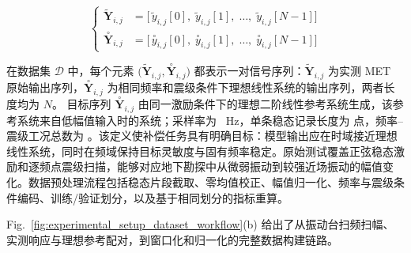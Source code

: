 \documentclass[sn-nature]{sn-jnl}
\newcommand{\fidx}{i} %
\newcommand{\midx}{j} %
\newcommand{\pmax}{N} %
\newcommand{\dataset}{{\mathcal{D}}} %
\newcommand{\yseq}{{\mathbf{Y}}} %
\newcommand{\ideal}[1]{\overset{\circ}{#1}} %
\newcommand{\exam}[1]{\tilde{#1}} %
\begin{document}
\begin{equation}
    \left\{
    \begin{aligned}
        \exam{\yseq}_{\fidx,\midx}  & =
        \bigl[
            \,\exam{y}_{\fidx,\midx}[0],\;
            \exam{y}_{\fidx,\midx}[1],\;
            \ldots,\;
            \exam{y}_{\fidx,\midx}[\pmax-1]
        \bigr]                          \\
        \ideal{\yseq}_{\fidx,\midx} & =
        \bigl[
            \,\ideal{y}_{\fidx,\midx}[0],\;
            \ideal{y}_{\fidx,\midx}[1],\;
            \ldots,\;
            \ideal{y}_{\fidx,\midx}[\pmax-1]
            \bigr]
    \end{aligned}
    \right.
    \label{eq:dataset_element}
\end{equation}

在数据集 $\dataset$ 中，每个元素 $\bigl(\exam{\yseq}_{\fidx,\midx}, \ideal{\yseq}_{\fidx,\midx}\bigr)$ 都表示一对信号序列：$\exam{\yseq}_{\fidx,\midx}$ 为实测 MET 原始输出序列，$\ideal{\yseq}_{\fidx,\midx}$ 为相同频率和震级条件下理想线性系统的输出序列，两者长度均为 $\pmax$。
目标序列 $\ideal{\yseq}_{\fidx,\midx}$ 由同一激励条件下的理想二阶线性参考系统生成，该参考系统来自低幅值输入时的系统；采样率为 \valSamplingFreq~Hz，单条稳态记录长度为 \valDatasetPointsPerRecord{} 点，频率--震级工况总数为 \valDatasetOperatingPoints{}。该定义使补偿任务具有明确目标：模型输出应在时域接近理想线性系统，同时在频域保持目标灵敏度与固有频率稳定。原始测试覆盖正弦稳态激励和逐频点震级扫描，能够对应地下勘探中从微弱振动到较强近场振动的幅值变化。数据预处理流程包括稳态片段截取、零均值校正、幅值归一化、频率与震级条件编码、训练/验证划分，以及基于相同划分的指标重算。


Fig.~\ref{fig:experimental_setup_dataset_workflow}(b) 给出了从振动台扫频扫幅、实测响应与理想参考配对，到窗口化和归一化的完整数据构建链路。
\end{document}
